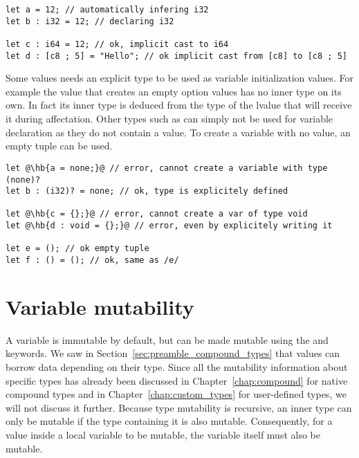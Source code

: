 \begin{lstlisting}[style=coloredverbatim, escapechar=@]
let a = 12; // automatically infering i32
let b : i32 = 12; // declaring i32

let c : i64 = 12; // ok, implicit cast to i64
let d : [c8 ; 5] = "Hello"; // ok implicit cast from [c8] to [c8 ; 5]
\end{lstlisting}

Some values needs an explicit type to be used as variable initialization values.
For example the value  that creates an empty option values has no
inner type on its own. In fact its inner type is deduced from the type of the
lvalue that will receive it during affectation. Other types such as 
can simply not be used for variable declaration as they do not contain a value.
To create a variable with no value, an empty tuple \token{()} can be used.

\begin{lstlisting}[style=coloredverbatim, escapechar=@]
let @\hb{a = none;}@ // error, cannot create a variable with type (none)?
let b : (i32)? = none; // ok, type is explicitely defined

let @\hb{c = {};}@ // error, cannot create a var of type void
let @\hb{d : void = {};}@ // error, even by explicitely writing it

let e = (); // ok empty tuple
let f : () = (); // ok, same as /e/
\end{lstlisting}

\vfill%
\pagebreak

\section{Variable mutability}
\label{sec:variable_mutability}

A variable is immutable by default, but can be made mutable using the
 and  keywords. We saw in
Section~\ref{sec:preamble_compound_types} that values can borrow data depending
on their type. Since all the mutability information about specific types has
already been discussed in Chapter~\ref{chap:compound} for native compound types
and in Chapter~\ref{chap:custom_types} for user-defined types, we will not
discuss it further. Because type mutability is recursive, an inner type can only
be mutable if the type containing it is also mutable. Consequently, for a value
inside a local variable to be mutable, the variable itself must also be mutable.


